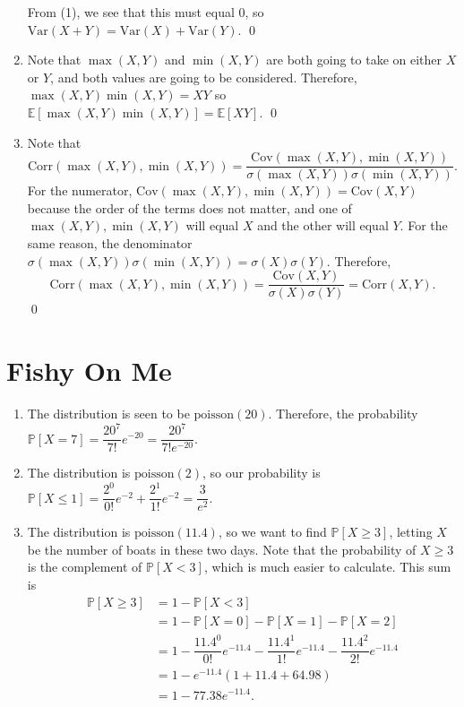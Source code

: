 \documentclass{article}
\newcommand{\p}{\mathbb{P}}
\newcommand{\ex}{\mathbb{E}}
\newcommand{\Var}{\text{Var}}
\begin{document}
\begin{enumerate}[label=(\alph*)]
	From (1), we see that this must equal 0, so $\Var(X+Y) = \Var(X) + \Var(Y)$. \qed
	\item Note that $\max(X, Y)$ and $\min(X, Y)$ are both going to take on either $X$ or $Y$, and both values are going to be considered. Therefore, $\max(X, Y) \min(X, Y) = XY$ so $\ex[\max(X, Y)\min(X, Y)] = \ex[XY]$. \qed
	\item Note that $$\text{Corr}(\max(X, Y), \min(X, Y)) = \dfrac{\text{Cov}(\max(X, Y), \min(X, Y))}{\sigma(\max(X, Y)) \sigma(\min(X, Y))}.$$ For the numerator, $\text{Cov}(\max(X, Y), \min(X, Y)) = \text{Cov}(X, Y)$ because the order of the terms does not matter, and one of $\max(X, Y), \min(X, Y)$ will equal $X$ and the other will equal $Y$. For the same reason, the denominator $\sigma(\max(X, Y)) \sigma(\min(X, Y)) = \sigma(X) \sigma(Y)$. Therefore, $$\text{Corr}(\max(X, Y), \min(X, Y)) = \dfrac{\text{Cov}(X, Y)}{\sigma(X) \sigma(Y)} = \text{Corr}(X, Y).$$ \qed
\end{enumerate}

\newpage
\section{Fishy On Me}
\begin{enumerate}[label=(\alph*)]
	\item The distribution is seen to be $\text{poisson}(20)$. Therefore, the probability $\p[X=7] = \dfrac{20^7}{7!} e^{-20} = \boxed{\dfrac{20^7}{7! e^{-20}}}$.
	\item The distribution is $\text{poisson}(2)$, so our probability is $\p[X \leq 1] = \dfrac{2^0}{0!} e^{-2} + \dfrac{2^1}{1!} e^{-2} = \boxed{\dfrac{3}{e^2}}$.
	\item The distribution is $\text{poisson}(11.4)$, so we want to find $\p[X \geq 3]$, letting $X$ be the number of boats in these two days. Note that the probability of $X \geq 3$ is the complement of $\p[X < 3]$, which is much easier to calculate. This sum is 
	\begin{align*}
		\p[X \geq 3] &= 1 - \p[X < 3] \\
		&= 1 - \p[X = 0] - \p[X = 1] - \p[X = 2] \\
		&= 1 - \dfrac{11.4^0}{0!} e^{-11.4} - \dfrac{11.4^1}{1!} e^{-11.4} - \dfrac{11.4^2}{2!} e^{-11.4} \\
		&= 1 - e^{-11.4} (1 + 11.4 + 64.98) \\
		&= \boxed{1 - 77.38 e^{-11.4}}.
	\end{align*}
\end{enumerate}
\end{document}
